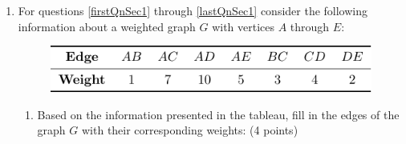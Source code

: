 \documentclass[12pt]{exam}
\begin{document}
\begin{enumerate} 

\item For questions \ref{firstQnSec1} through \ref{lastQnSec1} consider the following information about a weighted graph $G$ with vertices $A$ through $E$:\par
\begin{figure}[h]
    \centering
    \includegraphics{tableQ1.pdf}
\end{figure}

\begin{enumerate}
    \item \label{firstQnSec1} Based on the information presented in the tableau, fill in the edges of the graph $G$ with their corresponding weights: (4 points)
    \begin{figure}[h!]
        \centering
       

        \begin{tikzpicture}[x=0.75pt,y=0.75pt,yscale=-1,xscale=1]
            

\end{tikzpicture}
\end{figure}
\end{enumerate}
\end{enumerate}
\end{document}
